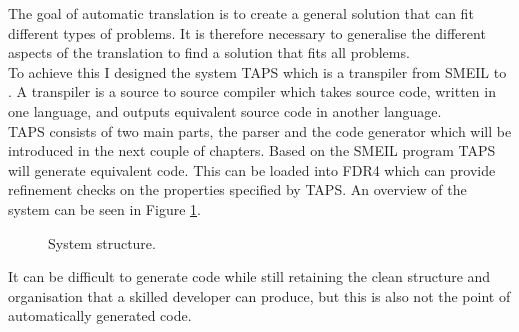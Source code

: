 The goal of automatic translation is to create a general solution that can fit different types of problems. It is therefore necessary to generalise the different aspects of the translation to find a solution that fits all problems.\\
To achieve this I designed the system TAPS which is a transpiler from SMEIL to \cspm{}. A transpiler is a source to source compiler which takes source code, written in one language, and outputs equivalent source code in another language.\\

TAPS consists of two main parts, the parser and the code generator which will be introduced in the next couple of chapters. Based on the SMEIL program TAPS will generate equivalent \cspm{} code. This can be loaded into FDR4 which can provide refinement checks on the properties specified by TAPS. An overview of the system can be seen in Figure \ref{fig:TAPS_network}.
\begin{figure}[!ht]
  \centering
  \caption{System structure.}
  \label{fig:TAPS_network}
\end{figure}

It can be difficult to generate code while still retaining the clean structure and organisation that a skilled developer can produce, but this is also not the point of automatically generated code. \\


